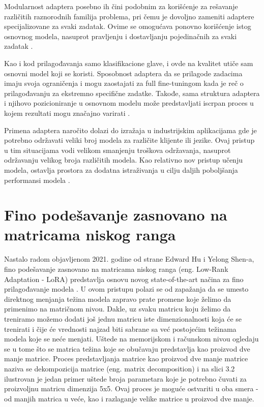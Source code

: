 \documentclass[12pt,oneside]{memoir}
\begin{document}
Modularnost adaptera posebno ih čini podobnim za korišćenje za rešavanje različitih raznorodnih familija problema, pri čemu je dovoljno zameniti adaptere specijalizovane za svaki zadatak. Ovime se omogućava ponovno korišćenje istog osnovnog modela, nasuprot pravljenju i dostavljanju pojedinačnih za svaki zadatak \cite{bapna2019adapteradaptation}.

Kao i kod prilagođavanja samo klasifikacione glave, i ovde na kvalitet utiče sam osnovni model koji se koristi. Sposobnost adaptera da se prilagode zadacima imaju svoja ograničenja i mogu zaostajati za full fine-tuningom kada je reč o prilagođavanju za ekstremno specifične zadatke. Takođe, sama struktura adaptera i njihovo pozicioniranje u osnovnom modelu može predstavljati iscrpan proces u kojem rezultati mogu značajno varirati \cite{he2021adaptereffectiveness}.

Primena adaptera naročito dolazi do izražaja u industrijskim aplikacijama gde je potrebno održavati veliki broj modela za različite klijente ili jezike. Ovaj pristup u tim situacijama vodi velikom smanjenju troškova održavanja, nasuprot održavanju velikog broja različitih modela. Kao relativno nov pristup učenju modela, ostavlja prostora za dodatna istraživanja u cilju daljih poboljšanja performansi modela \cite{pfeiffer2020adapterapplications}.


\section {Fino podešavanje zasnovano na matricama niskog ranga}
Nastalo radom objavljenom 2021. godine od strane Edward Hu i Yelong Shen-a, fino podešavanje zasnovano na matricama niskog ranga (eng. Low-Rank Adaptation - LoRA) predstavlja osnovu novog state-of-the-art načina za fino prilagođavanje modela \cite{LoRATechnique}. U ovom pristupu polazi se od zapažanja da se umesto direktnog menjanja težina modela zapravo prate promene koje želimo da primenimo na matričnom nivou. Dakle, uz svaku matricu koju želimo da treniramo možemo dodati još jednu matricu iste dimenzionalnosti koja će se trenirati i čije će vrednosti najzad biti sabrane sa već postojećim težinama modela koje se neće menjati. Uštede na memorijskom i računskom nivou ogledaju se u tome što se matrica težina koje se obučavaju predstavlja kao proizvod dve manje matrice. 
Proces predstavljanja matrice kao proizvod dve manje matrice naziva se dekompozicija matrice (eng. matrix decomposition) i na slici 3.2 ilustrovan je jedan primer uštede broja parametara koje je potrebno čuvati za proizvoljnu matricu dimenzija 5x5. Ovaj proces je moguće ostvariti u oba smera - od manjih matrica u veće, kao i razlaganje velike matrice u proizvod dve manje.
\end{document}
